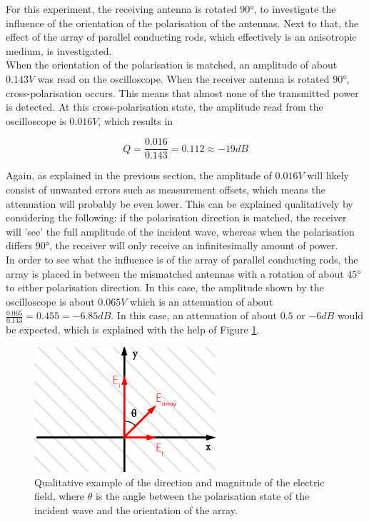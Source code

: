 For this experiment, the receiving antenna is rotated $90\si{\degree}$, to investigate the influence of the orientation of the polarisation of the antennas. Next to that, the effect of the array of parallel conducting rods, which effectively is an anisotropic medium, is investigated.\\

When the orientation of the polarisation is matched, an amplitude of about $0.143V$ was read on the oscilloscope. When the receiver antenna is rotated $90\si{\degree}$, cross-polarisation occurs. This means that almost none of the transmitted power is detected. At this cross-polarisation state, the amplitude read from the oscilloscope is $0.016V$, which results in

\begin{equation*}
    Q = \frac{0.016}{0.143} = 0.112 \approx -19 dB
\end{equation*}

Again, as explained in the previous section, the amplitude of $0.016V$ will likely consist of unwanted errors such as measurement offsets, which means the attenuation will probably be even lower. This can be explained qualitatively by considering the following: if the polarisation direction is matched, the receiver will 'see' the full amplitude of the incident wave, whereas when the polarisation differs $90\si{\degree}$, the receiver will only receive an infinitesimally amount of power. \\
In order to see what the influence is of the array of parallel conducting rods, the array is placed in between the mismatched antennas with a rotation of about $45\si{\degree}$ to either polarisation direction. In this case, the amplitude shown by the oscilloscope is about $0.065V$ which is an attenuation of about $\frac{0.065}{0.143} = 0.455 = -6.85 dB$. In this case, an attenuation of about $0.5$ or $-6 dB$ would be expected, which is explained with the help of Figure \ref{fig:Ass1_att}.

\begin{figure}[h]
    \centering
    \includegraphics[width=0.6\textwidth]{Session2_files/transmission.png}
    \caption{Qualitative example of the direction and magnitude of the electric field, where $\theta$ is the angle between the polarisation state of the incident wave and the orientation of the array.}
    \label{fig:Ass1_att}
\end{figure}

